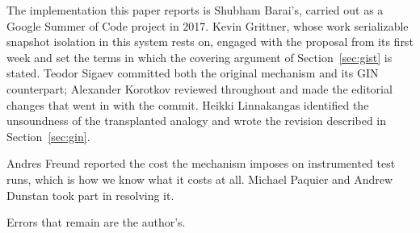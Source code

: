 \documentclass[11pt, a4paper]{article}
\begin{document}

The implementation this paper reports is Shubham Barai's, carried out as a
Google Summer of Code project in 2017. Kevin Grittner, whose work serializable
snapshot isolation in this system rests on, engaged with the proposal from its
first week and set the terms in which the covering argument of
Section~\ref{sec:gist} is stated. Teodor Sigaev committed both the original
mechanism and its GIN counterpart; Alexander Korotkov reviewed throughout and
made the editorial changes that went in with the commit. Heikki Linnakangas
identified the unsoundness of the transplanted analogy and wrote the revision
described in Section~\ref{sec:gin}.

Andres Freund reported the cost the mechanism imposes on instrumented test runs,
which is how we know what it costs at all. Michael Paquier and Andrew Dunstan
took part in resolving it.

Errors that remain are the author's.



\end{document}
